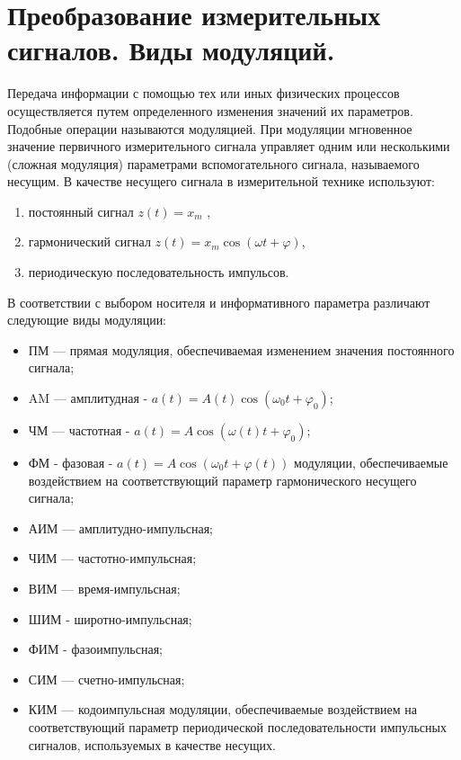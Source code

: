 \documentclass[unicode, 12pt, a4paper, oneside]{article}
\begin{document}
\section{Преобразование измерительных сигналов. Виды модуляций.}

Передача информации с помощью тех или иных физических процессов осуществляется путем определенного изменения значений их параметров. Подобные операции называются модуляцией. При модуляции мгновенное значение первичного измерительного сигнала управляет одним или несколькими (сложная модуляция) параметрами вспомогательного сигнала, называемого несущим. В качестве несущего сигнала в измерительной технике используют:
\begin{enumerate}
\item постоянный сигнал $z(t) = x_m$ ,
\item гармонический сигнал $z(t) = x_m \cos (\omega t + \varphi)$,
\item периодическую последовательность импульсов.
\end{enumerate}

В соответствии с выбором носителя и информативного параметра различают следующие виды модуляции:
\begin{itemize}
\item ПМ — прямая модуляция, обеспечиваемая изменением значения постоянного сигнала; 
\item AM — амплитудная - $a(t)=A(t)\cos(\omega_0t+\varphi_0)$;
\item ЧМ — частотная - $a(t)=A\cos(\omega(t)t+\varphi_0)$;  
\item ФМ - фазовая - $a(t)=A\cos(\omega_0t+\varphi(t))$ модуляции, обеспечиваемые воздействием на соответствующий параметр гармонического несущего сигнала; 
\item АИМ — амплитудно-импульсная;
\item ЧИМ — частотно-импульсная;
\item ВИМ — время-импульсная;
\item ШИМ - широтно-импульсная;
\item ФИМ - фазоимпульсная;
\item СИМ — счетно-импульсная;
\item КИМ — кодоимпульсная модуляции, обеспечиваемые воздействием на соответствующий параметр периодической последовательности импульсных сигналов, используемых в качестве несущих.
\end{itemize}
\end{document}
